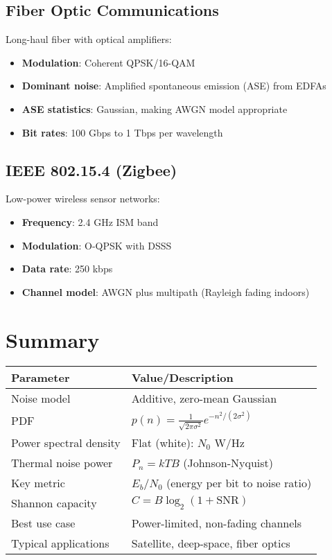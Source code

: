 \subsection{Fiber Optic Communications}

Long-haul fiber with optical amplifiers:
\begin{itemize}
\item \textbf{Modulation}: Coherent QPSK/16-QAM
\item \textbf{Dominant noise}: Amplified spontaneous emission (ASE) from EDFAs
\item \textbf{ASE statistics}: Gaussian, making AWGN model appropriate
\item \textbf{Bit rates}: 100 Gbps to 1 Tbps per wavelength
\end{itemize}

\subsection{IEEE 802.15.4 (Zigbee)}

Low-power wireless sensor networks:
\begin{itemize}
\item \textbf{Frequency}: 2.4 GHz ISM band
\item \textbf{Modulation}: O-QPSK with DSSS
\item \textbf{Data rate}: 250 kbps
\item \textbf{Channel model}: AWGN plus multipath (Rayleigh fading indoors)
\end{itemize}

\section{Summary}

\begin{center}
\begin{tabular}{@{}ll@{}}
\toprule
\textbf{Parameter} & \textbf{Value/Description} \\
\midrule
Noise model & Additive, zero-mean Gaussian \\
PDF & $p(n) = \frac{1}{\sqrt{2\pi\sigma^2}}e^{-n^2/(2\sigma^2)}$ \\
Power spectral density & Flat (white): $N_0$ W/Hz \\
Thermal noise power & $P_n = kTB$ (Johnson-Nyquist) \\
Key metric & $E_b/N_0$ (energy per bit to noise ratio) \\
Shannon capacity & $C = B\log_2(1 + \mathrm{SNR})$ \\
Best use case & Power-limited, non-fading channels \\
Typical applications & Satellite, deep-space, fiber optics \\
\bottomrule
\end{tabular}
\end{center}

